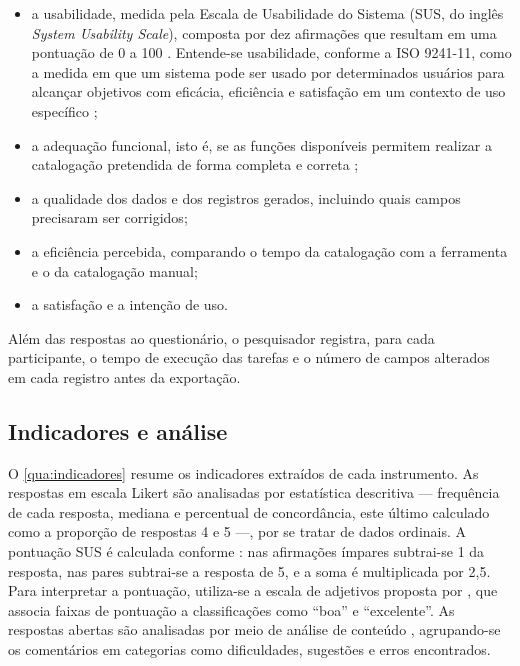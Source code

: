 \begin{itemize}
    \item a usabilidade, medida pela Escala de Usabilidade do Sistema (SUS, do inglês \textit{System Usability Scale}), composta por dez afirmações que resultam em uma pontuação de 0 a 100 \cite{brooke1996}. Entende-se usabilidade, conforme a ISO 9241-11, como a medida em que um sistema pode ser usado por determinados usuários para alcançar objetivos com eficácia, eficiência e satisfação em um contexto de uso específico \cite{iso9241};
    \item a adequação funcional, isto é, se as funções disponíveis permitem realizar a catalogação pretendida de forma completa e correta \cite{iso25010};
    \item a qualidade dos dados e dos registros gerados, incluindo quais campos precisaram ser corrigidos;
    \item a eficiência percebida, comparando o tempo da catalogação com a ferramenta e o da catalogação manual;
    \item a satisfação e a intenção de uso.
\end{itemize}

Além das respostas ao questionário, o pesquisador registra, para cada participante, o tempo de execução das tarefas e o número de campos alterados em cada registro antes da exportação.

\subsection{Indicadores e análise}
\label{subsec:indicadores}

O \autoref{qua:indicadores} resume os indicadores extraídos de cada instrumento. As respostas em escala Likert são analisadas por estatística descritiva --- frequência de cada resposta, mediana e percentual de concordância, este último calculado como a proporção de respostas 4 e 5 ---, por se tratar de dados ordinais. A pontuação SUS é calculada conforme : nas afirmações ímpares subtrai-se 1 da resposta, nas pares subtrai-se a resposta de 5, e a soma é multiplicada por 2,5. Para interpretar a pontuação, utiliza-se a escala de adjetivos proposta por , que associa faixas de pontuação a classificações como ``boa'' e ``excelente''. As respostas abertas são analisadas por meio de análise de conteúdo \cite{bardin2016}, agrupando-se os comentários em categorias como dificuldades, sugestões e erros encontrados.


